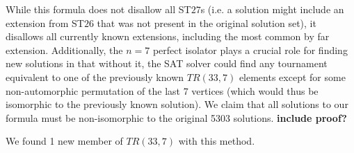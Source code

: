 \documentclass[conference]{IEEEtran}
\begin{document}
While this formula does not disallow all ST$27$s (i.e. a solution might include an extension from ST$26$ that was not present in the original solution set), it disallows all currently known extensions, including the most common by far extension. Additionally, the $n=7$ perfect isolator plays a crucial role for finding new solutions in that without it, the SAT solver could find any tournament equivalent to one of the previously known $TR(33,7)$ elements except for some non-automorphic permutation of the last 7 vertices (which would thus be isomorphic to the previously known solution). We claim that all solutions to our formula must be non-isomorphic to the original 5303 solutions. \textbf{include proof?}

We found 1 new member of $TR(33,7)$ with this method. 




\end{document}
